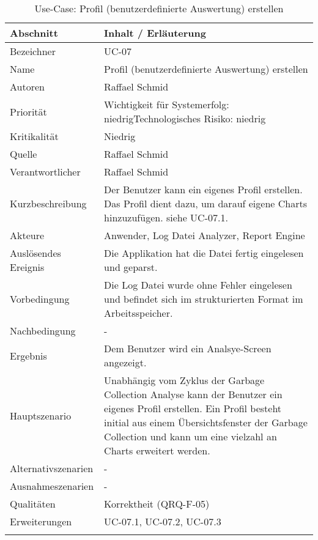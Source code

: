 \begin{longtable}{|p{4cm}|p{10.5cm}|}
\hline
   \textbf{Abschnitt} & \textbf{Inhalt / Erläuterung} \\\hline
   Bezeichner & UC-07\\\hline
   Name &Profil (benutzerdefinierte Auswertung) erstellen\\\hline
   Autoren & Raffael Schmid\\\hline
   Priorität & Wichtigkeit für Systemerfolg: niedrig\newline Technologisches Risiko: niedrig\\\hline
   Kritikalität & Niedrig\\\hline
   Quelle & Raffael Schmid\\\hline
   Verantwortlicher & Raffael Schmid\\\hline
   Kurzbeschreibung & Der Benutzer kann ein eigenes Profil erstellen. Das Profil dient dazu, um darauf eigene Charts hinzuzufügen. siehe UC-07.1.\\\hline
   Akteure & Anwender, Log Datei Analyzer, Report Engine\\\hline
   Auslösendes Ereignis & Die Applikation hat die Datei fertig eingelesen und geparst.\\\hline
   Vorbedingung & Die Log Datei wurde ohne Fehler eingelesen und befindet sich im strukturierten Format im Arbeitsspeicher.\\\hline
   Nachbedingung & -\\\hline
   Ergebnis & Dem Benutzer wird ein Analsye-Screen angezeigt.\\\hline
   Hauptszenario & Unabhängig vom Zyklus der Garbage Collection Analyse kann der Benutzer ein eigenes Profil erstellen. Ein Profil besteht initial aus einem Übersichtsfenster der Garbage Collection und kann um eine vielzahl an Charts erweitert werden.\\\hline
   Alternativszenarien & -\\\hline
   Ausnahmeszenarien & -\\\hline
   Qualitäten & Korrektheit (QRQ-F-05)\\\hline
   Erweiterungen & UC-07.1, UC-07.2, UC-07.3\\\hline

\caption{Use-Case: Profil (benutzerdefinierte Auswertung) erstellen }
\end{longtable}

